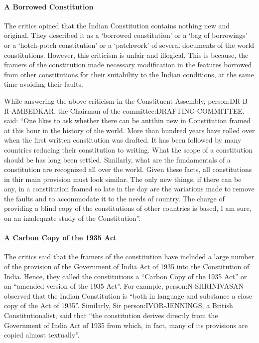 \paragraph{A Borrowed Constitution}

The critics opined that the Indian Constitution contains nothing new and original. They described it as a `borrowed constitution' or a `bag of borrowings' or a `hotch-potch constitution' or a `patchwork' of several documents of the world constitutions. However, this criticism is unfair and illogical. This is because, the framers of the constitution made necessary modification in the features borrowed from other constitutions for their suitability to the Indian conditions, at the same time avoiding their faults.

While answering the above criticism in the Constituent Assembly, \gls{person:DR-B-R-AMBEDKAR}, the Chairman of the \gls{committee:DRAFTING-COMMITTEE}, said: ``One likes to ask whether there can be antthin new in Constitution framed at this hour in the history of the world. More than hundred years have rolled over when the first written constitution was drafted. It has been followed by many countries reducing their constitution to writing. What the scope of a constitution should be has long been settled. Similarly, what are the fundamentals of a constitution are recognized all over the world. Given these facts, all constitutions in thir main provision must look similar. The only new things, if there can be any, in a constitution framed so late in the day are the variations made to remove the faults and to accommodate it to the needs of country. The charge of providing a blind copy of the constitutions of other countries is based, I am sure, on an inadequate study of the Constitution''.

\paragraph{A Carbon Copy of the 1935 Act}

The critics said that the framers of the constitution have included a large number of the provision of the Government of India Act of 1935 into the Constitution of India. Hence, they called the constitutions a ``Carbon Copy of the 1935 Act'' or an ``amended version of the 1935 Act''. For example, \gls{person:N-SHRINIVASAN} observed that the Indian Constitution is ``both in language and substance a close copy of the Act of 1935''. Similarly, Sir \gls{person:IVOR-JENNINGS}, a British Constitutionalist, said that ``the constitution derives directly from the Government of India Act of 1935 from which, in fact, many of its provisions are copied almost textually''.

